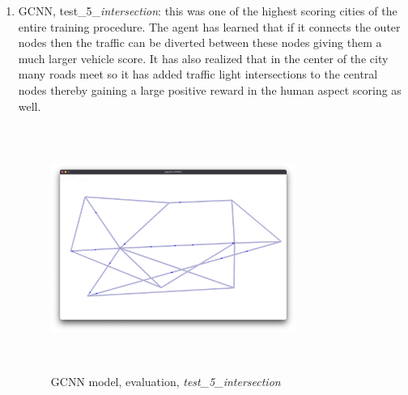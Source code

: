 \documentclass[
]{elteikthesis}[2023/04/10]
\begin{document}
\begin{enumerate}
\item GCNN, test\_5\_\emph{intersection}: this was one of the highest scoring
cities of the entire training procedure. The agent has learned that
if it connects the outer nodes then the traffic can be diverted between
these nodes giving them a much larger vehicle score. It has also realized
that in the center of the city many roads meet so it has added
traffic light intersections to the central nodes thereby gaining a
large positive reward in the human aspect scoring as well. 
\begin{figure}[H]
\begin{centering}
\includegraphics[width=8cm,height=8cm,keepaspectratio]{images/city_agent_gcnn_2023-05-03_23-33_test_5_intersection}
\par\end{centering}
\caption{GCNN model, evaluation, \emph{test\_5\_intersection}}


\end{figure}
\end{enumerate}
\end{document}
